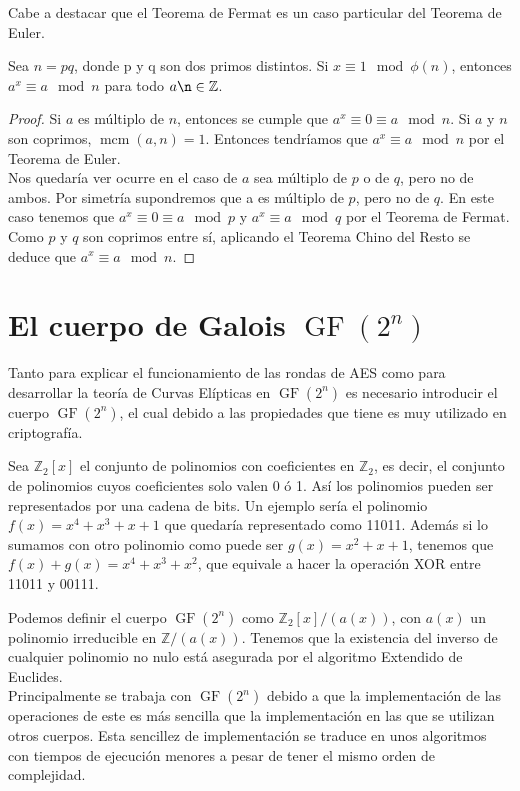 Cabe a destacar que el Teorema de Fermat es un caso particular del Teorema de Euler.\\

\begin{proposicion}
	Sea $n = pq$, donde p y q son dos primos distintos. Si $x\equiv 1 \mod \phi(n)$, entonces $a^x\equiv a\mod n$ para todo $ a \n \in \mathbb{Z}$.
\end{proposicion}\vspace*{-5mm}

	\begin{proof}
		Si $a$ es múltiplo de $n$, entonces se cumple que $a^x \equiv 0 \equiv a \mod n$. Si $a$ y $n$ son coprimos, $\operatorname{mcm}(a,n) = 1$. Entonces tendríamos que $a^x \equiv a \mod n$ por el Teorema de Euler.\\
		Nos quedaría ver ocurre en el caso de $a$ sea múltiplo de $p$ o de $q$, pero no de ambos. Por simetría supondremos que a es múltiplo de $p$, pero no de $q$. En este caso tenemos que $a^x \equiv 0 \equiv a \mod p$  y $a^x \equiv a \mod q$ por el Teorema de Fermat. Como $p$ y $q$ son coprimos entre sí, aplicando el Teorema Chino del Resto se deduce que $a^x \equiv a \mod n$.\qedhere
	\end{proof}

\section{El cuerpo de Galois $\operatorname{GF}(2^n)$}
Tanto para explicar el funcionamiento de las rondas de AES como para desarrollar la teoría de Curvas Elípticas en $\operatorname{GF}(2^n)$ es necesario introducir el cuerpo $\operatorname{GF}(2^n)$, el cual debido a las propiedades que tiene es muy utilizado en criptografía.

Sea $\mathbb{Z}_2[x]$ el conjunto de polinomios con coeficientes en $\mathbb{Z}_2$, es decir, el conjunto de polinomios cuyos coeficientes solo valen 0 ó 1. Así los polinomios pueden ser representados por una cadena de bits.
 Un ejemplo sería el polinomio $f(x)=x^4+x^3+x+1$ que quedaría representado como 11011. 
Además si lo sumamos con otro polinomio como puede ser $g(x)=x^2+x+1$, tenemos que $f(x)+g(x)=x^4+x^3+x^2$, que equivale a hacer la operación XOR entre 11011 y 00111.

Podemos definir el cuerpo $\operatorname{GF}(2^n)$ como $\mathbb{Z}_2[x]/(a(x))$, con $a(x)$ un polinomio irreducible en $\mathbb{Z}/(a(x))$. Tenemos que la existencia del inverso de cualquier polinomio no nulo está asegurada por el algoritmo Extendido de Euclides.\\ 
Principalmente se trabaja con $\operatorname{GF}(2^n)$ debido a que la implementación de las operaciones de este es más sencilla que la implementación en las que se utilizan otros cuerpos. Esta sencillez de implementación se traduce en unos algoritmos con tiempos de ejecución menores a pesar de tener el mismo orden de complejidad.

